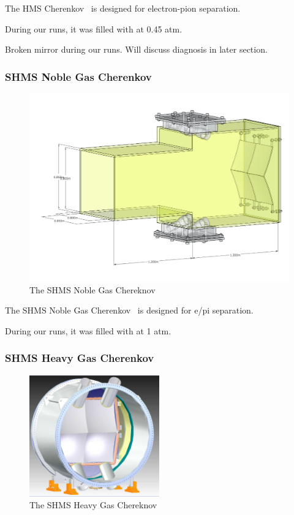 The HMS Cherenkov~\cite{Cothran_1995} is designed for electron-pion separation.

During our runs, it was filled with  at 0.45 atm.

Broken mirror during our runs. Will discuss diagnosis in later section.

\subsubsection{SHMS Noble Gas Cherenkov}
\begin{figure}[ht]
    \centering
    \includegraphics[width=1.0\textwidth]{chap3/shms_ngc_render.png}
    \caption{The SHMS Noble Gas Chereknov }
    \label{fig:shms_ngcer}
\end{figure}

The SHMS Noble Gas Cherenkov~\cite{NGC_Design_Report} is designed for e/pi
separation.

During our runs, it was filled with  at 1 atm.

\subsubsection{SHMS Heavy Gas Cherenkov}
\begin{figure}[ht]
    \centering
    \includegraphics[width=0.5\textwidth]{chap3/shms_hgc_render.png}
    \caption{The SHMS Heavy Gas Chereknov }
    \label{fig:shms_hgcer}
\end{figure}

